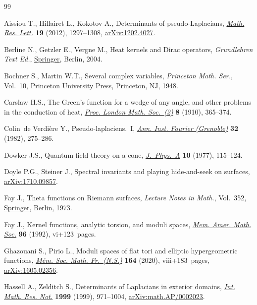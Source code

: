 \documentclass[pdftex]{sigma}
\numberwithin{equation}{section}
\theoremstyle{definition}
\begin{document}
\begin{thebibliography}{99}
\footnotesize\itemsep=0pt

Aissiou T., Hillairet L., Kokotov A., Determinants of pseudo-{L}aplacians,
 \href{https://doi.org/10.4310/MRL.2012.v19.n6.a10}{\textit{Math. Res. Lett.}}
 \textbf{19} (2012), 1297--1308,
 \href{http://arxiv.org/abs/1202.4027}{arXiv:1202.4027}.

Berline N., Getzler E., Vergne M., Heat kernels and {D}irac operators,
 \textit{Grundlehren Text Ed.},
 \href{https://doi.org/10.1007/978-3-642-58088-8}{Springer}, Berlin, 2004.

Bochner S., Martin W.T., Several complex variables, \textit{Princeton Math.
 Ser.}, Vol.~10, Princeton University Press, Princeton, NJ, 1948.

Carslaw H.S., The {G}reen's function for a wedge of any angle, and other
 problems in the conduction of heat,
 \href{https://doi.org/10.1112/plms/s2-8.1.365}{\textit{Proc. London Math.
 Soc.~(2)}} \textbf{8} (1910), 365--374.

Colin~de Verdi\`ere Y., Pseudo-laplaciens.~{I},
 \href{https://doi.org/10.5802/aif.890}{\textit{Ann. Inst. Fourier
 (Grenoble)}} \textbf{32} (1982), 275--286.

Dowker J.S., Quantum field theory on a cone,
 \href{https://doi.org/10.1088/0305-4470/10/1/023}{\textit{J.~Phys.~A}}
 \textbf{10} (1977), 115--124.

Doyle P.G., Steiner J., Spectral invariants and playing hide-and-seek on
 surfaces, \href{http://arxiv.org/abs/1710.09857}{arXiv:1710.09857}.

Fay J., Theta functions on {R}iemann surfaces, \textit{Lecture Notes in Math.},
 Vol.~352, \href{https://doi.org/10.1007/BFb0060090}{Springer}, Berlin, 1973.

Fay J., Kernel functions, analytic torsion, and moduli spaces,
 \href{https://doi.org/10.1090/memo/0464}{\textit{Mem. Amer. Math. Soc.}}
 \textbf{96} (1992), vi+123~pages.

Ghazouani S., Pirio L., Moduli spaces of flat tori and elliptic hypergeometric
 functions, \href{https://doi.org/10.24033/msmf.472}{\textit{M\'em. Soc. Math.
 Fr.~(N.S.)}} \textbf{164} (2020), viii+183~pages,
 \href{http://arxiv.org/abs/1605.02356}{arXiv:1605.02356}.

Hassell A., Zelditch S., Determinants of {L}aplacians in exterior domains,
 \href{https://doi.org/10.1155/S1073792899000513}{\textit{Int. Math. Res.
 Not.}} \textbf{1999} (1999), 971--1004,
 \href{http://arxiv.org/abs/math.AP/0002023}{arXiv:math.AP/0002023}.


\end{thebibliography}
\end{document}

